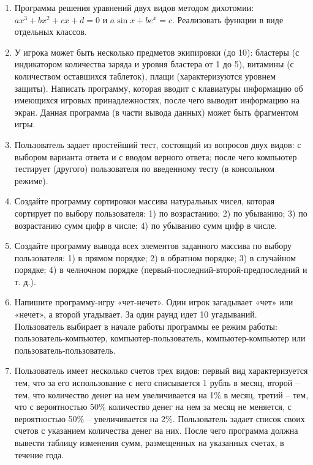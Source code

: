 \documentclass[12pt]{article}
\begin{document}
\begin{enumerate}
\item Программа решения уравнений двух видов методом дихотомии: $ax^3+bx^2+cx+d=0$ и $a\sin x+ be^x=c$.
Реализовать функции в виде отдельных классов.

\item У игрока может быть несколько предметов экипировки (до 10): бластеры (с индикатором количества заряда и уровня
бластера от 1 до 5), 
витамины (с количеством оставшихся таблеток), плащи (характеризуются уровнем защиты). Написать программу, которая 
вводит с клавиатуры информацию об имеющихся игровых принадлежностях, после чего выводит информацию на экран.
Данная программа (в части вывода данных) может быть фрагментом игры.

\item Пользователь задает простейший тест, состоящий из вопросов двух видов: с выбором варианта ответа и с вводом верного 
ответа; после чего компьютер тестирует (другого) пользователя по введенному тесту (в консольном режиме).

\item Создайте программу сортировки массива натуральных чисел, которая сортирует по выбору пользователя: 
1) по возрастанию; 2) по убыванию; 3) по возрастанию сумм цифр в числе; 4) по убыванию сумм цифр в числе.

\item Создайте программу вывода всех элементов заданного массива по выбору пользователя: 1) в прямом порядке; 2)
в обратном порядке; 3) в случайном порядке; 4) в челночном порядке (первый-последний-второй-предпоследний и т. д.).

\item Напишите программу-игру «чет-нечет». Один игрок загадывает «чет» или «нечет», а второй угадывает. За один раунд 
идет 10 угадываний. Пользователь выбирает в начале работы программы ее режим работы: пользователь-компьютер,
компьютер-пользователь, компьютер-компьютер или пользователь-пользователь.

\item Пользователь имеет несколько счетов трех видов: первый вид характеризуется тем, что за его использование с него списывается 1
рубль в месяц, второй -- тем, что количество денег на нем увеличивается на 1\% в месяц,
третий -- тем, что с вероятностью 50\% количество денег на нем за месяц не меняется, с вероятностью 50\% --
увеличивается на 2\%. Пользователь задает список своих счетов с указанием количества денег на них. После чего
программа должна вывести таблицу изменения сумм, размещенных на указанных счетах, в течение года.


\end{enumerate}
\end{document}
